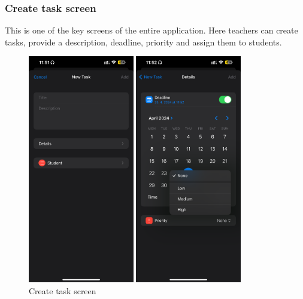 \documentclass[
  biblatex,
  language=english,
  figures=false,
  sourcecodes,
  glossaries,
  index
]{kidiplom}
\begin{document}
\subsubsection{Create task screen}
This is one of the key screens of the entire application. Here teachers can create tasks, provide a description, deadline, priority and assign them to students.

\begin{figure}[ht]
\centering
\begin{minipage}[b]{0.4\textwidth}
	\includegraphics[height=10cm]{image10}
\end{minipage}
\begin{minipage}[b]{0.4\textwidth}
	\includegraphics[height=10cm]{image11}
\end{minipage}
\caption{Create task screen}
\label{fig:image10-11}
\end{figure}
\end{document}
